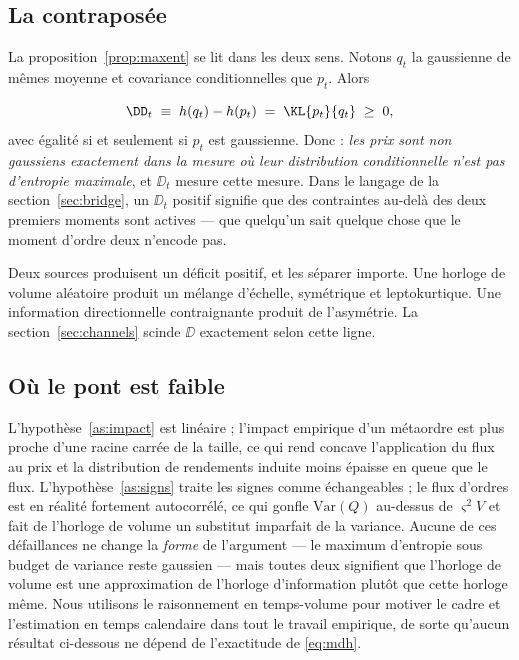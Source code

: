 \subsection{La contraposée}
\label{sec:contrapositive}

La proposition~\ref{prop:maxent} se lit dans les deux sens. Notons $q_t$ la
gaussienne de mêmes moyenne et covariance conditionnelles que $p_t$. Alors

\begin{equation}
\label{eq:deficit}
\DD_t \;\equiv\; h(q_t) - h(p_t) \;=\; \KL{p_t}{q_t} \;\ge\; 0,
\end{equation}
avec égalité si et seulement si $p_t$ est gaussienne. Donc : \emph{les prix sont
non gaussiens exactement dans la mesure où leur distribution conditionnelle n'est
pas d'entropie maximale}, et $\DD_t$ mesure cette mesure. Dans le langage de la
section~\ref{sec:bridge}, un $\DD_t$ positif signifie que des contraintes
au-delà des deux premiers moments sont actives --- que quelqu'un sait quelque
chose que le moment d'ordre deux n'encode pas.

Deux sources produisent un déficit positif, et les séparer importe. Une horloge
de volume aléatoire produit un mélange d'échelle, symétrique et leptokurtique.
Une information directionnelle contraignante produit de l'asymétrie. La
section~\ref{sec:channels} scinde $\DD$ exactement selon cette ligne.

\subsection{Où le pont est faible}
\label{sec:bridge-caveats}

L'hypothèse~\ref{as:impact} est linéaire ; l'impact empirique d'un métaordre est
plus proche d'une racine carrée de la taille, ce qui rend concave l'application
du flux au prix et la distribution de rendements induite moins épaisse en queue
que le flux. L'hypothèse~\ref{as:signs} traite les signes comme échangeables ;
le flux d'ordres est en réalité fortement autocorrélé, ce qui gonfle
$\mathrm{Var}(Q)$ au-dessus de $\varsigma^2 V$ et fait de l'horloge de volume un
substitut imparfait de la variance. Aucune de ces défaillances ne change la
\emph{forme} de l'argument --- le maximum d'entropie sous budget de variance
reste gaussien --- mais toutes deux signifient que l'horloge de volume est une
approximation de l'horloge d'information plutôt que cette horloge même. Nous
utilisons le raisonnement en temps-volume pour motiver le cadre et l'estimation
en temps calendaire dans tout le travail empirique, de sorte qu'aucun résultat
ci-dessous ne dépend de l'exactitude de \eqref{eq:mdh}.

